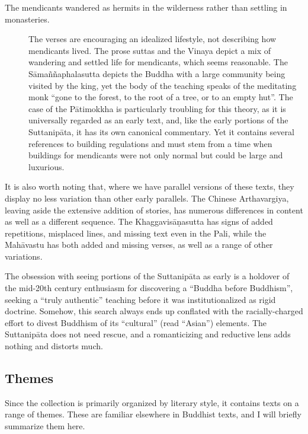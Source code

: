 \documentclass[12pt,openany]{book}%
\begin{document}
\begin{description}
\item[The mendicants wandered as hermits in the wilderness rather than settling in monasteries.] The verses are encouraging an idealized lifestyle, not describing how mendicants lived. The prose suttas and the Vinaya depict a mix of wandering and settled life for mendicants, which seems reasonable. The \textsanskrit{Sāmaññaphalasutta} depicts the Buddha with a large community being visited by the king, yet the body of the teaching speaks of the meditating monk “gone to the forest, to the root of a tree, or to an empty hut”. The case of the \textsanskrit{Pātimokkha} is particularly troubling for this theory, as it is universally regarded as an early text, and, like the early portions of the \textsanskrit{Suttanipāta}, it has its own canonical commentary. Yet it contains several references to building regulations and must stem from a time when buildings for mendicants were not only normal but could be large and luxurious.%
\end{description}

It is also worth noting that, where we have parallel versions of these texts, they display no less variation than other early parallels. The Chinese Arthavargiya, leaving aside the extensive addition of stories, has numerous differences in content as well as a different sequence. The \textsanskrit{Khaggavisāṇasutta} has signs of added repetitions, misplaced lines, and missing text even in the Pali, while the \textsanskrit{Mahāvastu} has both added and missing verses, as well as a range of other variations.

The obsession with seeing portions of the \textsanskrit{Suttanipāta} as early is a holdover of the mid-20th century enthusiasm for discovering a “Buddha before Buddhism”, seeking a “truly authentic” teaching before it was institutionalized as rigid doctrine. Somehow, this search always ends up conflated with the racially-charged effort to divest Buddhism of its “cultural” (read “Asian”) elements. The \textsanskrit{Suttanipāta} does not need rescue, and a romanticizing and reductive lens adds nothing and distorts much.

\subsection*{Themes}

Since the collection is primarily organized by literary style, it contains texts on a range of themes. These are familiar elsewhere in Buddhist texts, and I will briefly summarize them here.
\end{document}
